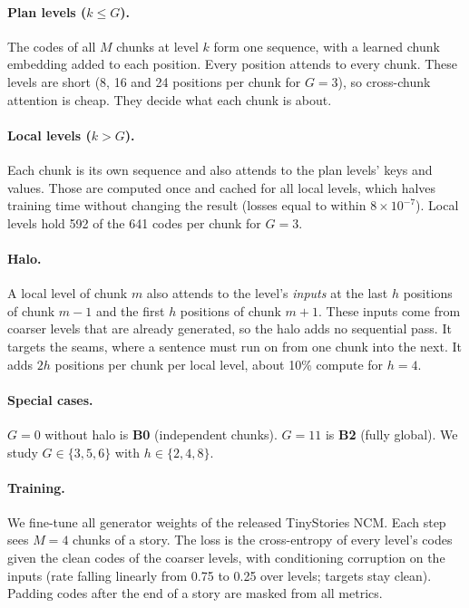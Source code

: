 \documentclass[10pt,twocolumn]{article}
\begin{document}
\paragraph{Plan levels ($k\le G$).} The codes of all $M$ chunks at level $k$ form one sequence, with a learned chunk
embedding added to each position. Every position attends to every chunk. These levels are short (8, 16 and 24
positions per chunk for $G{=}3$), so cross-chunk attention is cheap. They decide what each chunk is about.

\paragraph{Local levels ($k>G$).} Each chunk is its own sequence and also attends to the plan levels' keys and
values. Those are computed once and cached for all local levels, which halves training time without changing the
result (losses equal to within $8{\times}10^{-7}$). Local levels hold 592 of the 641 codes per chunk for $G{=}3$.

\paragraph{Halo.} A local level of chunk $m$ also attends to the level's \emph{inputs} at the last $h$ positions
of chunk $m{-}1$ and the first $h$ positions of chunk $m{+}1$. These inputs come from coarser levels that are
already generated, so the halo adds no sequential pass. It targets the seams, where a sentence must run on from one
chunk into the next. It adds $2h$ positions per chunk per local level, about 10\% compute for $h{=}4$.

\paragraph{Special cases.} $G{=}0$ without halo is \textbf{B0} (independent chunks). $G{=}11$ is \textbf{B2}
(fully global). We study $G\in\{3,5,6\}$ with $h\in\{2,4,8\}$.

\paragraph{Training.} We fine-tune all generator weights of the released TinyStories NCM. Each step sees $M{=}4$
chunks of a story. The loss is the cross-entropy of every level's codes given the clean codes of the coarser levels,
with conditioning corruption on the inputs (rate falling linearly from 0.75 to 0.25 over levels; targets stay
clean). Padding codes after the end of a story are masked from all metrics.
\end{document}

